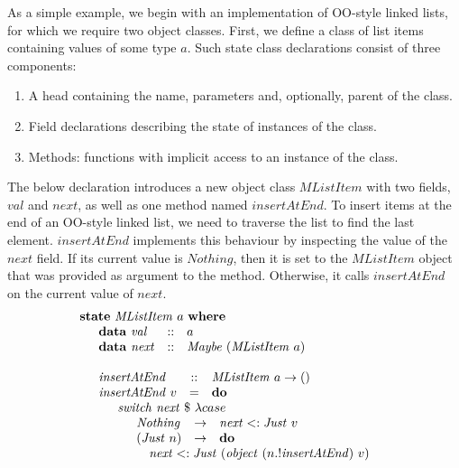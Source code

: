 As a simple example, we begin with an implementation of OO-style linked lists, for which we require two object classes. First, we define a class of list items containing values of some type $a$. Such state class declarations consist of three components: 
\begin{enumerate}
    \item A head containing the name, parameters and, optionally, parent of the class.
    \item Field declarations describing the state of instances of the class.
    \item Methods: functions with implicit access to an instance of the class.
\end{enumerate}
The below declaration introduces a new object class $\mathit{MListItem}$ with two fields, $\mathit{val}$ and $\mathit{next}$, as well as one method named $\mathit{insertAtEnd}$. To insert items at the end of an OO-style linked list, we need to traverse the list to find the last element.  $\mathit{insertAtEnd}$ implements this behaviour by inspecting the value of the $\mathit{next}$ field. If its current value is $\mathit{Nothing}$, then it is set to the $\mathit{MListItem}$ object that was provided as argument to the method. Otherwise, it calls $\mathit{insertAtEnd}$ on the current value of $\mathit{next}$.
\begin{displaymath}
\begin{array}{l}
\mathbf{state}~\mathit{MListItem}~a~\mathbf{where} \\
\quad \begin{array}{lcl}
\mathbf{data}~\mathit{val} & :: & a \\
\mathbf{data}~\mathit{next}  & :: & \mathit{Maybe}~(\mathit{MListItem}~a)
\end{array}\\\\
\quad \begin{array}{lcl}
\mathit{insertAtEnd} & :: & \mathit{MListItem}~a \to ()\\
\mathit{insertAtEnd}~v & = & \mathbf{do} \\
\multicolumn{3}{l}{\quad \begin{array}{l}
    \mathit{switch}~\mathit{next}~\$~\lambda case \\
    \quad \begin{array}{lcl}
        \mathit{Nothing} & \to & \mathit{next} <: \mathit{Just}~v  \\
        (\mathit{Just}~n) & \to & \mathbf{do} \\
            \multicolumn{3}{l}{\quad \mathit{next} <: \mathit{Just}~(\mathit{object}~(n.!\mathit{insertAtEnd})~v) }
    \end{array}
    \end{array}}
\end{array}
\end{array}
\end{displaymath}
